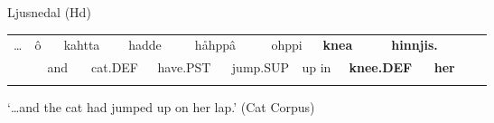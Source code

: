 \begin{listWWNumileveli}
\item {}

\begin{styleExample}
Ljusnedal (Hd)

\end{styleExample}

\end{listWWNumileveli}

\begin{listWWNumlxxxiiileveli}
\item {}

\end{listWWNumlxxxiiileveli}

\begin{tabular}{llllllllllllllllll}
\lsptoprule
… & \multicolumn{2}{l}{ô

} & \multicolumn{2}{l}{kahtta

} & \multicolumn{2}{l}{hadde

} & \multicolumn{2}{l}{håhppâ

} & \multicolumn{2}{l}{ohppi

} & \multicolumn{2}{l}{{\bfseries knea}

} & \multicolumn{2}{l}{{\bfseries hinnjis.}

} & \multicolumn{2}{l}{} & \\
\multicolumn{2}{l}{} & \multicolumn{2}{l}{and

} & \multicolumn{2}{l}{cat.DEF

} & \multicolumn{2}{l}{have.PST

} & \multicolumn{2}{l}{jump.SUP

} & \multicolumn{2}{l}{up in

} & \multicolumn{2}{l}{{\bfseries knee.DEF}

} & \multicolumn{2}{l}{{\bfseries her}

} & \multicolumn{2}{l}{}\\
\lspbottomrule
\end{tabular}

\begin{styleTranslation}
 ‘…and the cat had jumped up on her lap.’ (Cat Corpus)

\end{styleTranslation}

